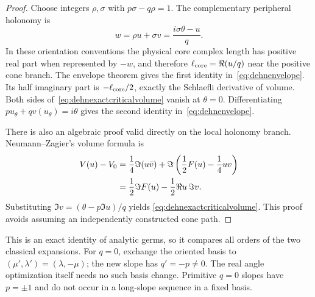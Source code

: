\documentclass[11pt,a4paper]{article}
\numberwithin{equation}{section}
\theoremstyle{definition}
\theoremstyle{remark}
\begin{document}
\begin{proof}
Choose integers $\rho,\sigma$ with $p\sigma-q\rho=1$.
The complementary peripheral holonomy is
\[
 w=\rho u+\sigma v=\frac{i\sigma\theta-u}{q}.
\]
In these orientation conventions the physical core complex length
has positive real part when represented by $-w$, and therefore
$\ell_{\rm core}=\Re(u/q)$ near the positive cone branch.
The envelope theorem gives the first identity
in~\eqref{eq:dehnenvelope}. Its half imaginary part is
$-\ell_{\rm core}/2$, exactly the Schlaefli derivative of volume.
Both sides of~\eqref{eq:dehnexactcriticalvolume} vanish at $\theta=0$.
Differentiating $pu_\theta+qv(u_\theta)=i\theta$ gives the second
identity in~\eqref{eq:dehnenvelope}.

There is also an algebraic proof valid directly on the local holonomy
branch. Neumann--Zagier's volume formula is
\begin{align}
 V(u)-V_0
 &=\frac14\Im(u\bar v)
     +\Im\left(\frac12F(u)-\frac14uv\right)\notag\\
 &=\frac12\Im F(u)-\frac12\Re u\,\Im v.
 \label{eq:NZrealvolume}
\end{align}
Substituting $\Im v=(\theta-p\Im u)/q$ yields
\eqref{eq:dehnexactcriticalvolume}. This proof avoids assuming
an independently constructed cone path.
\end{proof}

This is an exact identity of analytic germs, so it compares all
orders of the two classical expansions. For $q=0$, exchange the
oriented basis to $(\mu',\lambda')=(\lambda,-\mu)$; the new slope
has $q'=-p\ne0$. The real angle optimization itself needs no such
basis change. Primitive $q=0$ slopes have $p=\pm1$ and do not
occur in a long-slope sequence in a fixed basis.
\end{document}
